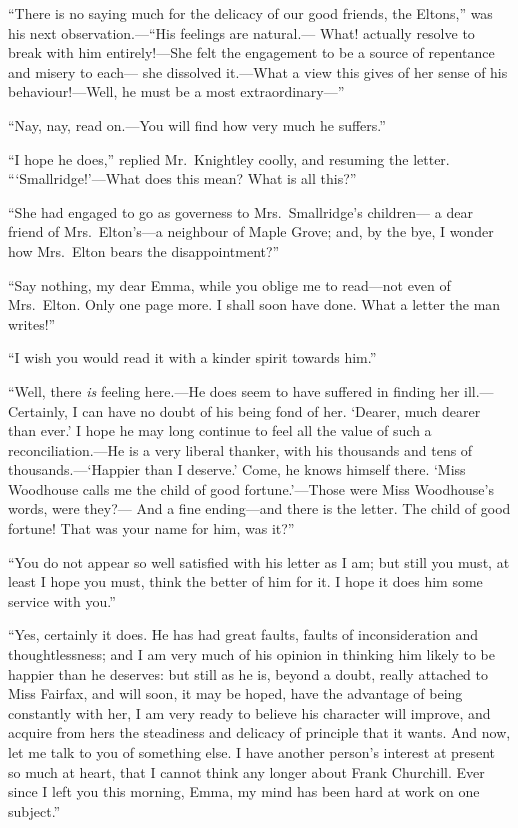 ``There is no saying much for the delicacy of our good friends,
the Eltons,'' was his next observation.---``His feelings are natural.---%
What! actually resolve to break with him entirely!---She felt
the engagement to be a source of repentance and misery to each---%
she dissolved it.---What a view this gives of her sense of
his behaviour!---Well, he must be a most extraordinary---''

``Nay, nay, read on.---You will find how very much he suffers.''

``I hope he does,'' replied Mr.\ Knightley coolly, and resuming the letter.
```Smallridge!'---What does this mean?  What is all this?''

``She had engaged to go as governess to Mrs.\ Smallridge's children---%
a dear friend of Mrs.\ Elton's---a neighbour of Maple Grove; and,
by the bye, I wonder how Mrs.\ Elton bears the disappointment?''

``Say nothing, my dear Emma, while you oblige me to read---not even
of Mrs.\ Elton.  Only one page more.  I shall soon have done.
What a letter the man writes!''

``I wish you would read it with a kinder spirit towards him.''

``Well, there \emph{is} feeling here.---He does seem to have suffered in finding
her ill.---Certainly, I can have no doubt of his being fond of her.
`Dearer, much dearer than ever.'  I hope he may long continue to feel
all the value of such a reconciliation.---He is a very liberal thanker,
with his thousands and tens of thousands.---`Happier than I deserve.'
Come, he knows himself there.  `Miss Woodhouse calls me the child
of good fortune.'---Those were Miss Woodhouse's words, were they?---%
And a fine ending---and there is the letter.  The child of good fortune!
That was your name for him, was it?''

``You do not appear so well satisfied with his letter as I am;
but still you must, at least I hope you must, think the better
of him for it.  I hope it does him some service with you.''

``Yes, certainly it does.  He has had great faults, faults of
inconsideration and thoughtlessness; and I am very much of his
opinion in thinking him likely to be happier than he deserves:
but still as he is, beyond a doubt, really attached to Miss Fairfax,
and will soon, it may be hoped, have the advantage of being constantly
with her, I am very ready to believe his character will improve,
and acquire from hers the steadiness and delicacy of principle
that it wants.  And now, let me talk to you of something else.
I have another person's interest at present so much at heart,
that I cannot think any longer about Frank Churchill.  Ever since I
left you this morning, Emma, my mind has been hard at work on
one subject.''

